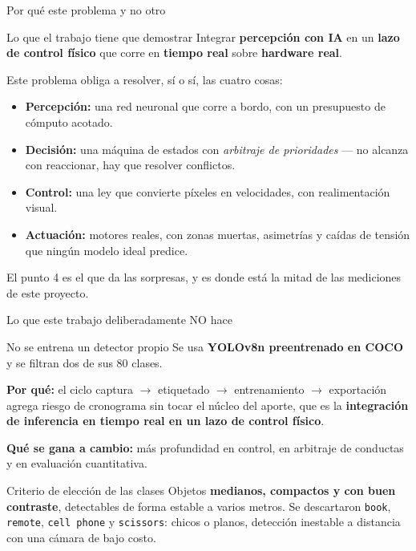 \documentclass[aspectratio=169,10pt]{beamer}
\newcommand{\hacia}{$\rightarrow$}
\newcommand{\destaca}[1]{\textcolor{azul}{\textbf{#1}}}
\begin{document}
\begin{frame}{Por qué este problema y no otro}
  \begin{block}{Lo que el trabajo tiene que demostrar}
    Integrar \textbf{percepción con IA} en un \textbf{lazo de control físico} que
    corre en \textbf{tiempo real} sobre \textbf{hardware real}.
  \end{block}

  \vspace{0.5em}
  Este problema obliga a resolver, sí o sí, las cuatro cosas:

  \begin{itemize}
    \item \textbf{Percepción:} una red neuronal que corre a bordo, con un
          presupuesto de cómputo acotado.
    \item \textbf{Decisión:} una máquina de estados con \emph{arbitraje de
          prioridades} --- no alcanza con reaccionar, hay que resolver conflictos.
    \item \textbf{Control:} una ley que convierte píxeles en velocidades, con
          realimentación visual.
    \item \textbf{Actuación:} motores reales, con zonas muertas, asimetrías y
          caídas de tensión que ningún modelo ideal predice.
  \end{itemize}

  \vspace{0.5em}
  \small El punto 4 es el que da las sorpresas, y es donde está la mitad de las
  mediciones de este proyecto.
\end{frame}

\begin{frame}{Lo que este trabajo deliberadamente NO hace}
  \begin{block}{No se entrena un detector propio}
    Se usa \textbf{YOLOv8n preentrenado en COCO} y se filtran dos de sus 80 clases.
  \end{block}

  \vspace{0.6em}
  \textbf{Por qué:} el ciclo captura \hacia{} etiquetado \hacia{} entrenamiento \hacia{}
  exportación agrega riesgo de cronograma sin tocar el núcleo del aporte, que es
  la \destaca{integración de inferencia en tiempo real en un lazo de control físico}.

  \vspace{0.6em}
  \textbf{Qué se gana a cambio:} más profundidad en control, en arbitraje de
  conductas y en evaluación cuantitativa.

  \vspace{0.8em}
  \begin{alertblock}{Criterio de elección de las clases}
    Objetos \textbf{medianos, compactos y con buen contraste}, detectables de
    forma estable a varios metros. Se descartaron \texttt{book}, \texttt{remote},
    \texttt{cell phone} y \texttt{scissors}: chicos o planos, detección inestable
    a distancia con una cámara de bajo costo.
  \end{alertblock}
\end{frame}
\end{document}
